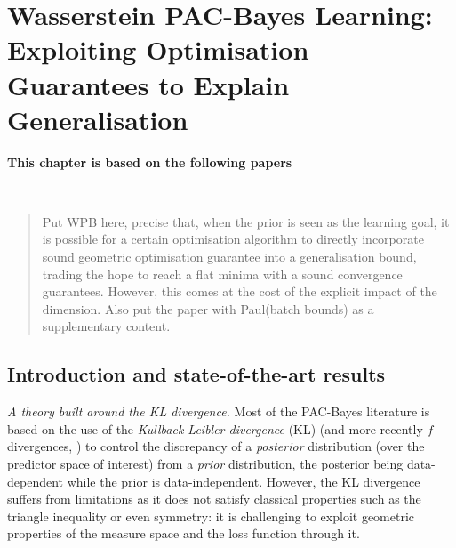 \chapter[Wasserstein PAC-Bayes Learning: Exploiting Optimisation Guarantees to Explain Generalisation]{Wasserstein PAC-Bayes Learning: Exploiting Optimisation Guarantees to Explain Generalisation}
\label{chap: wass-pb}
\addchapterlof
\addchapterloa
\addchapterloe

\vspace{-1.6cm}
\begin{center}
\textbf{This chapter is based on the following papers}\\
\end{center}
\vspace{-0.3cm}
\\

\vspace{-0.3cm}
\minitoc

\vspace{-0.2cm}

\begin{abstract}
    Put WPB here, precise that, when the prior is seen as the learning goal, it is possible for a certain optimisation algorithm to directly incorporate sound geometric optimisation guarantee into a generalisation bound, trading the hope to reach a flat minima with a sound convergence guarantees. However, this comes at the cost of the explicit impact of the dimension. Also put the paper with Paul(batch bounds) as a supplementary content.
\end{abstract}

\newpage

\section{Introduction and state-of-the-art results}

\textit{A theory built around the KL divergence.}
Most of the PAC-Bayes literature is based on the use of the \emph{Kullback-Leibler divergence} (KL) (and more recently $f$-divergences, \citealp{ohnishi2021novel,picard2022change}) to control the discrepancy of a \emph{posterior} distribution (over the predictor space of interest) from a \emph{prior} distribution, the posterior being data-dependent while the prior is data-independent. However, the KL divergence suffers from limitations as it does not satisfy classical properties such as the triangle inequality or even symmetry: it is challenging to exploit geometric properties of the measure space and the loss function through it.

